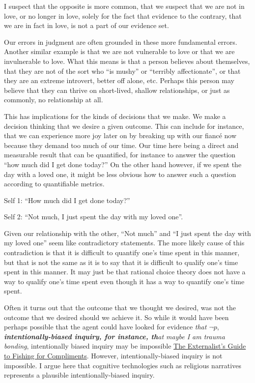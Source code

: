 \documentclass[
  letterpaper,
  DIV=11,
  numbers=noendperiod]{scrartcl}
\begin{document}
I suspect that the opposite is more common, that we suspect that we are
not in love, or no longer in love, solely for the fact that evidence to
the contrary, that we are in fact in love, is not a part of our evidence
set.

Our errors in judgment are often grounded in these more fundamental
errors. Another similar example is that we are not vulnerable to love or
that we are invulnerable to love. What this means is that a person
believes about themselves, that they are not of the sort who ``is
mushy'' or ``terribly affectionate'', or that they are an extreme
introvert, better off alone, etc. Perhaps this person may believe that
they can thrive on short-lived, shallow relationships, or just as
commonly, no relationship at all.

This has implications for the kinds of decisions that we make. We make a
decision thinking that we desire a given outcome. This can include for
instance, that we can experience more joy later on by breaking up with
our fiancé now because they demand too much of our time. Our time here
being a direct and measurable result that can be quantified, for
instance to answer the question ``how much did I get done today?'' On
the other hand however, if we spent the day with a loved one, it might
be less obvious how to answer such a question according to quantifiable
metrics.

Self 1: ``How much did I get done today?''

Self 2: ``Not much, I just spent the day with my loved one''.

Given our relationship with the other, ``Not much'' and ``I just spent
the day with my loved one'' seem like contradictory statements. The more
likely cause of this contradiction is that it is difficult to quantify
one's time spent in this manner, but that is not the same as it is to
say that it is difficult to qualify one's time spent in this manner. It
may just be that rational choice theory does not have a way to qualify
one's time spent even though it has a way to quantify one's time spent.

Often it turns out that the outcome that we thought we desired, was not
the outcome that we desired should we achieve it. So while it would have
been perhaps possible that the agent could have looked for evidence
\emph{that \(\neg p\)}, \emph{\textbf{intentionally-biased inquiry, for
instance, th}at maybe I am trauma bonding}, intentionally biased inquiry
may be impossible
\href{https://app.notion.com/p/The-Externalist-s-Guide-to-Fishing-for-Compliments-3a38935bcf8a81c790eeca5e35bbdddc?pvs=21}{The
Externalist's Guide to Fishing for Compliments}. However,
intentionally-biased inquiry is not impossible. I argue here that
cognitive technologies such as religious narratives represents a
plausible intentionally-biased inquiry.
\end{document}

